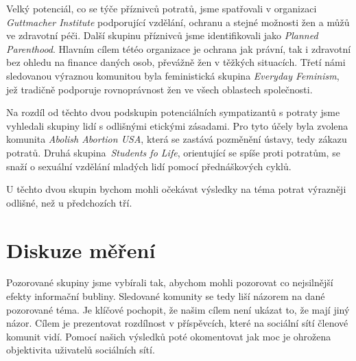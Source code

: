 \documentclass[12pt, a4paper]{article}
\numberwithin{equation}{section} 	%
\begin{document}
Velký potenciál, co se týče příznivců potratů, jsme spatřovali v organizaci \textit{Guttmacher Institute} podporující vzdělání, ochranu a stejné možnosti žen a můžů ve zdravotní péči. Další skupinu příznivců jsme identifikovali jako \textit{Planned Parenthood}. Hlavním cílem tétéo organizace je ochrana jak právní, tak i zdravotní bez ohledu na finance daných osob, převážně žen v těžkých situacích.  Třetí námi sledovanou výraznou komunitou byla feministická skupina \textit{Everyday Feminism}, jež tradičně podporuje rovnoprávnost žen ve všech oblastech společnosti.

Na rozdíl od těchto dvou podskupin potenciálních sympatizantů s potraty jsme vyhledali skupiny lidí s odlišnými etickými zásadami. Pro tyto účely byla zvolena komunita \textit{Abolish Abortion USA}, která se zastává pozměnění ústavy, tedy zákazu potratů. Druhá skupina~\textit{Students fo Life}, orientující se spíše proti potratům, se snaží o sexuální vzdělání mladých lidí pomocí přednáškových cyklů.

U těchto dvou skupin bychom mohli očekávat výsledky na téma potrat výrazněji odlišné, než u předchozích tří.

\newpage
\section{Diskuze měření}
\noindent Pozorované skupiny jsme vybírali tak, abychom mohli pozorovat co nejsilnější efekty informační bubliny. Sledované komunity se tedy liší názorem na dané pozorované téma.  Je klíčové pochopit, že našim cílem není ukázat to, že mají jiný názor. Cílem je prezentovat rozdílnost v příspěvcích, které na sociální sítí členové komunit vidí. Pomocí našich výsledků poté okomentovat jak moc je ohrožena objektivita uživatelů sociálních sítí.
\end{document}
